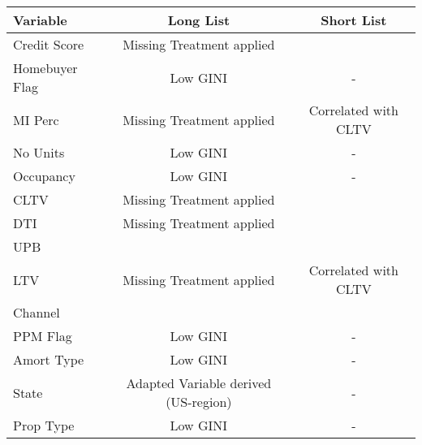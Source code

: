 \begin{longtable}{ l c c }\toprule    
\textbf{Variable}           & \textbf{Long List} 											& \textbf{Short List}						 \\\midrule
Credit Score                & \cellcolor[HTML]{C0F0C0}Missing Treatment applied            & \cellcolor[HTML]{C0F0C0}                     \\
Homebuyer Flag              & \cellcolor[HTML]{F7D9E1}Low GINI                             & -                                            \\
MI Perc                     & \cellcolor[HTML]{C0F0C0}Missing Treatment applied            & \cellcolor[HTML]{F7D9E1}Correlated with CLTV \\
No Units                    & \cellcolor[HTML]{F7D9E1}Low GINI                             & -                                            \\
Occupancy                   & \cellcolor[HTML]{F7D9E1}Low GINI                             & -                                            \\
CLTV                        & \cellcolor[HTML]{C0F0C0}Missing Treatment applied            & \cellcolor[HTML]{C0F0C0}                     \\
DTI                         & \cellcolor[HTML]{C0F0C0}Missing Treatment applied            & \cellcolor[HTML]{C0F0C0}                     \\
UPB                         & \cellcolor[HTML]{C0F0C0}                                     & \cellcolor[HTML]{C0F0C0}                     \\
LTV                         & \cellcolor[HTML]{C0F0C0}Missing Treatment applied            & \cellcolor[HTML]{F7D9E1}Correlated with CLTV \\
Channel                     & \cellcolor[HTML]{C0F0C0}                                     & \cellcolor[HTML]{C0F0C0}                     \\
PPM Flag                    & \cellcolor[HTML]{F7D9E1}Low GINI                             & -                                            \\
Amort Type                  & \cellcolor[HTML]{F7D9E1}Low GINI                             & -                                            \\
State                       & \cellcolor[HTML]{F7D9E1}Adapted Variable derived (US-region) & -                                            \\
Prop Type                   & \cellcolor[HTML]{F7D9E1}Low GINI                             & -                                            \\

\end{longtable}
